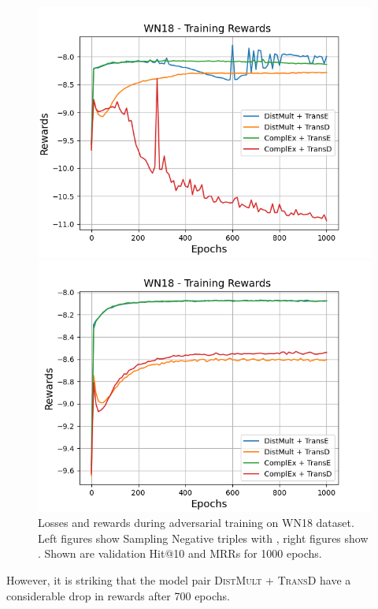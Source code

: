 \begin{figure}
\begin{minipage}{.5\textwidth}
      \centering
      \includegraphics[width=0.9\linewidth]{figures/results/gan_train/not_pretrained/uncertainty/max/entropy/wn18/1k_epochs/uncertainty_wn18_rew.png}
    \end{minipage}%
    \begin{minipage}{.5\textwidth}
      \centering
      \includegraphics[width=0.9\linewidth]{figures/results/gan_train/not_pretrained/uncertainty/max_distribution/entropy/wn18/1k_epochs/uncertainty_wn18_rew.png}
    \end{minipage}%
    \caption{Losses and rewards during adversarial training on \textsc{WN18} dataset. 
    Left figures show Sampling Negative triples with \usmax, right figures show \ussoftmax.
    Shown are validation Hit@10 and MRRs for 1000 epochs.}
    \label{fig:advtrain_wn18_usmax_ussoftmax_losses_rewards}
\end{figure}
However, it is striking that the model pair \textsc{DistMult} + \textsc{TransD} have a considerable drop in rewards after 700 epochs.